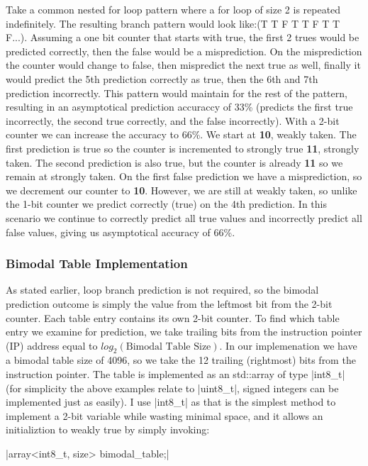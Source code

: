 \documentclass[12pt, twocolumn]{article}
\begin{document}
Take a common nested for loop pattern where a for loop of size 2 is repeated indefinitely. The resulting branch pattern would look like:(T T F T T F T T F...). Assuming a one bit counter that starts with true, the first 2 trues would be predicted correctly, then the false would be a misprediction. On the misprediction the counter would change to false, then mispredict the next true as well, finally it would predict the 5th prediction correctly as true, then the 6th and 7th prediction incorrectly. This pattern would maintain for the rest of the pattern, resulting in an asymptotical prediction accuraccy of 33\% (predicts the first true incorrectly, the second true correctly, and the false incorrectly). With a 2-bit counter we can increase the accuracy to 66\%. We start at \textbf{10}, weakly taken. The first prediction is true so the counter is incremented to strongly true \textbf{11}, strongly taken. The second prediction is also true, but the counter is already \textbf{11} so we remain at strongly taken. On the first false prediction we have a misprediction, so we decrement our counter to \textbf{10}. However, we are still at weakly taken, so unlike the 1-bit counter we predict correctly (true) on the 4th prediction. In this scenario we continue to correctly predict all true values and incorrectly predict all false values, giving us asymptotical accuracy of 66\%.
\subsubsection{Bimodal Table Implementation} \label{sec:dt:impl}
As stated earlier, loop branch prediction is not required, so the bimodal prediction outcome is simply the value from the leftmost bit from the 2-bit counter. Each table entry contains its own 2-bit counter. To find which table entry we examine for prediction, we take trailing bits from the instruction pointer (IP) address equal to $log_2(\text{Bimodal Table Size})$. In our implemenation we have a bimodal table size of 4096, so we take the 12 trailing (rightmost) bits from the instruction pointer. The table is implemented as an std::array of type |int8_t| (for simplicity the above examples relate to |uint8_t|, signed integers can be implemented just as easily). I use |int8_t| as that is the simplest method to implement a 2-bit variable while wasting minimal space, and it allows an initializtion to weakly true by simply invoking:

\noindent|array<int8_t, size> bimodal_table{};|
\end{document}
